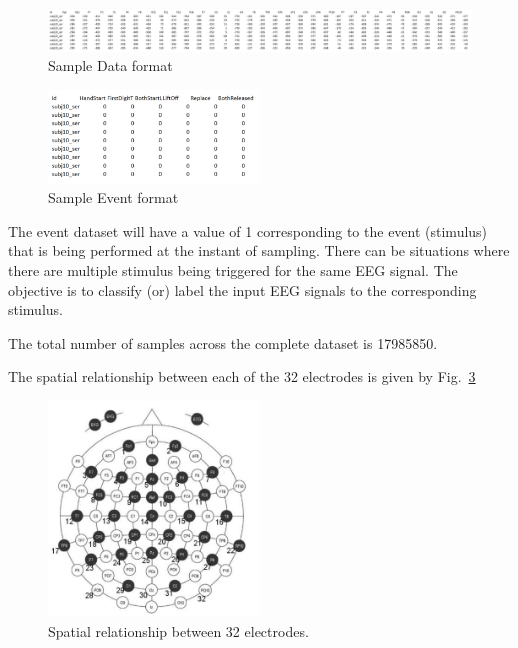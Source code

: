 \documentclass[final,leqno,onefignum,onetabnum]{siamltexmm}
\begin{document}
\begin{figure}[ht!]
  \centering
  \includegraphics[width=1\textwidth]{images/sample_data}
  \caption{Sample Data format\label{fig:Sample_data}}
\end{figure}

\begin{figure}[ht!]
  \centering
  \includegraphics[width=0.5\textwidth]{images/sample_events}
  \caption{Sample Event format\label{fig:sample_events}}
\end{figure}

The event dataset will have a value of 1 corresponding to the event (stimulus) that is being performed at the instant of sampling.  There can be situations where there are multiple stimulus being triggered for the same EEG signal.  The objective is to classify (or) label the input EEG signals to the corresponding stimulus.

The total number of samples across the complete dataset is 17985850.

The spatial relationship between each of the 32 electrodes is given by Fig.~\ref{fig:eeg_spatial_relation}

\begin{figure}
  \centering
  \includegraphics[width=0.5\textwidth]{images/eeg_spatial}
  \caption{Spatial relationship between 32 electrodes.\label{fig:eeg_spatial_relation}} 
\end{figure}
\end{document}
